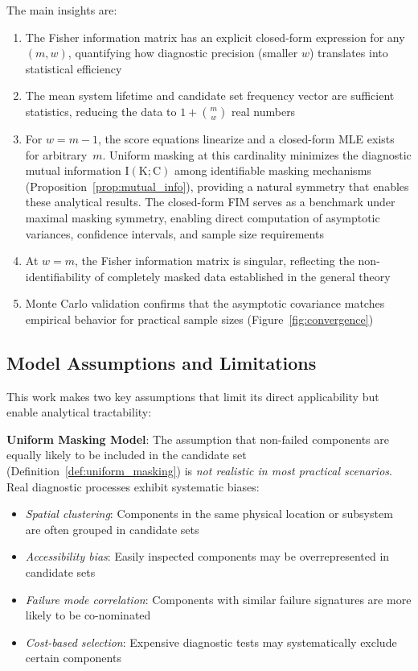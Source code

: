 \documentclass[pdflatex,sn-mathphys-num,Numbered]{sn-jnl}
\newcommand{\RV}[1]{\mathrm{#1}}
\newcommand{\cand}{\RV{C}}         %
\theoremstyle{thmstyleone}
\theoremstyle{thmstylethree}
\theoremstyle{thmstyletwo}
\begin{document}
The main insights are:
\begin{enumerate}
\item The Fisher information matrix has an explicit closed-form expression for any $(m, w)$, quantifying how diagnostic precision (smaller $w$) translates into statistical efficiency
\item The mean system lifetime and candidate set frequency vector are sufficient statistics, reducing the data to $1 + \binom{m}{w}$ real numbers
\item For $w = m-1$, the score equations linearize and a closed-form MLE exists for arbitrary~$m$. Uniform masking at this cardinality minimizes the diagnostic mutual information $\RV{I}(\RV{K}; \cand)$ among identifiable masking mechanisms (Proposition~\ref{prop:mutual_info}), providing a natural symmetry that enables these analytical results. The closed-form FIM serves as a benchmark under maximal masking symmetry, enabling direct computation of asymptotic variances, confidence intervals, and sample size requirements
\item At $w = m$, the Fisher information matrix is singular, reflecting the non-identifiability of completely masked data established in the general theory~\cite{towell2025masked}
\item Monte Carlo validation confirms that the asymptotic covariance matches empirical behavior for practical sample sizes (Figure~\ref{fig:convergence})
\end{enumerate}

\subsection{Model Assumptions and Limitations}
\label{subsec:limitations}

This work makes two key assumptions that limit its direct applicability but enable analytical tractability:

\textbf{Uniform Masking Model}: The assumption that non-failed components are equally likely to be included in the candidate set (Definition~\ref{def:uniform_masking}) is \emph{not realistic in most practical scenarios}. Real diagnostic processes exhibit systematic biases:
\begin{itemize}
\item \emph{Spatial clustering}: Components in the same physical location or subsystem are often grouped in candidate sets
\item \emph{Accessibility bias}: Easily inspected components may be overrepresented in candidate sets
\item \emph{Failure mode correlation}: Components with similar failure signatures are more likely to be co-nominated
\item \emph{Cost-based selection}: Expensive diagnostic tests may systematically exclude certain components
\end{itemize}
\end{document}
